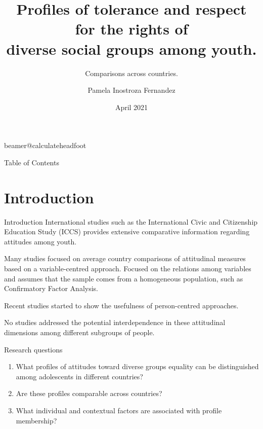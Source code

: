 \documentclass[11pt,t]{beamer}
\title[]{Profiles of tolerance and respect for the rights of \\diverse social groups among youth.} %
\subtitle{Comparisons across countries.}
\author{Pamela Inostroza Fernandez}
\institute{Master in Statistics and Data Science - KU Leuven}
\date{April 2021}
\begin{document}
\csname beamer@calculateheadfoot\endcsname %


\begin{frame}
	\titlepage
\end{frame}
	

\begin{frame}{Table of Contents}
	\hfill	{\large \parbox{.961\textwidth}{\tableofcontents[hideothersubsections]}}
\end{frame}


\section{Introduction}

\begin{frame}[c,plain]{Introduction}
\vspace{-11pt}
International studies such as the International Civic and Citizenship Education Study (ICCS) provides extensive comparative information regarding attitudes among youth.

\vspace{11pt}

Many studies focused on average country comparisons of attitudinal measures based on a variable-centred approach. Focused on the relations among variables and assumes that the sample comes from a homogeneous population, such as Confirmatory Factor Analysis.
\vspace{11pt}

Recent studies started to show the usefulness of person-centred approaches.

\vspace{11pt}

No studies addressed the potential interdependence in these attitudinal dimensions among different subgroups of people.
\end{frame}

\begin{frame}[c,plain]{Research questions}

\begin{enumerate}
\item What profiles of attitudes toward diverse groups equality can be distinguished among adolescents in different countries?
\vspace{11pt}

\item Are these profiles comparable across countries?
\vspace{11pt}
\color{lightgray} \item What individual and contextual factors are associated with profile membership? 
\end{enumerate}	
		
\end{frame}
\end{document}
